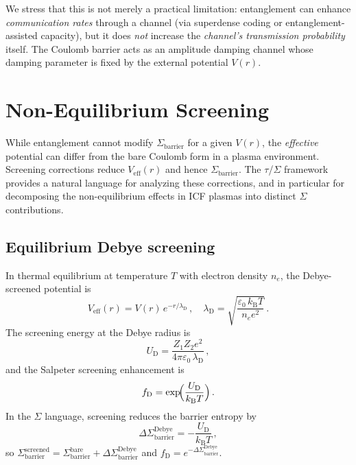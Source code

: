 \documentclass[prc,twocolumn,superscriptaddress,longbibliography,floatfix]{revtex4-2}
\newcommand{\kB}{k_{\mathrm{B}}}
\newcommand{\Sbar}{\Sigma_{\mathrm{barrier}}}
\newcommand{\lD}{\lambda_{\mathrm{D}}}
\newcommand{\UD}{U_{\mathrm{D}}}
\newcommand{\fD}{f_{\mathrm{D}}}
\begin{document}
We stress that this is not merely a practical limitation:
entanglement can enhance \emph{communication rates} through a channel
(via superdense coding or entanglement-assisted capacity), but it does
\emph{not} increase the \emph{channel's transmission probability}
itself.  The Coulomb barrier acts as an amplitude damping channel
whose damping parameter is fixed by the external potential $V(r)$.

\section{Non-Equilibrium Screening}
\label{sec:neq}

While entanglement cannot modify $\Sbar$ for a given $V(r)$, the
\emph{effective} potential can differ from the bare Coulomb form in a
plasma environment.  Screening corrections reduce $V_{\mathrm{eff}}(r)$
and hence $\Sbar$.  The $\tau$/$\Sigma$ framework provides a
natural language for analyzing these corrections, and in particular
for decomposing the non-equilibrium effects in ICF plasmas into
distinct $\Sigma$ contributions.

\subsection{Equilibrium Debye screening}

In thermal equilibrium at temperature $T$ with electron density $n_{e}$,
the Debye-screened potential is
\begin{equation}
V_{\mathrm{eff}}(r) = V(r)\,e^{-r/\lD}\,,\quad
\lD = \sqrt{\frac{\varepsilon_{0}\,\kB T}{n_{e}e^{2}}}\,.
\label{eq:debye}
\end{equation}
The screening energy at the Debye radius is
\begin{equation}
\UD = \frac{Z_{1}Z_{2}e^{2}}{4\pi\varepsilon_{0}\,\lD}\,,
\end{equation}
and the Salpeter screening enhancement is~\cite{Salpeter1954}
\begin{equation}
\fD = \exp\!\Bigl(\frac{\UD}{\kB T}\Bigr)\,.
\label{eq:f_debye}
\end{equation}
In the $\Sigma$ language, screening reduces the barrier entropy by
\begin{equation}
\Delta\Sbar^{\mathrm{Debye}} = -\frac{\UD}{\kB T}\,,
\label{eq:delta_sigma_debye}
\end{equation}
so $\Sbar^{\mathrm{screened}} = \Sbar^{\mathrm{bare}}
+ \Delta\Sbar^{\mathrm{Debye}}$ and
$\fD = e^{-\Delta\Sbar^{\mathrm{Debye}}}$.
\end{document}
